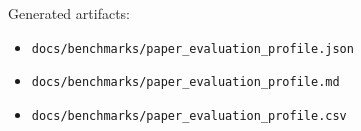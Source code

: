 \documentclass[11pt]{article}
\begin{document}
Generated artifacts:

\begin{itemize}[leftmargin=1.5em]
  \item \texttt{docs/benchmarks/paper\_evaluation\_profile.json}
  \item \texttt{docs/benchmarks/paper\_evaluation\_profile.md}
  \item \texttt{docs/benchmarks/paper\_evaluation\_profile.csv}
\end{itemize}



\end{document}
